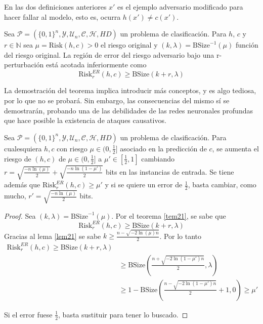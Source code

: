 En las dos definiciones anteriores $x'$ es el ejemplo adversario modificado para hacer fallar al modelo, esto es, ocurra $h(x')\neq c(x')$.

\begin{teorema} \label{tem21}
Sea \(\mathcal{P}=(\{0,1\}^n,\mathcal{Y},\mathcal{U}_n,\mathcal{C},\mathcal{H},HD)\) un problema de clasificación. Para \(h\), \(c\) y \(r \in \mathbb{N}\) sea \(\mu = \text{Risk}(h,c) > 0\) el riesgo original y \((k,\lambda)=\text{BSize}^{-1}(\mu)\) función del riesgo original. La región de error del riesgo adversario bajo una r-perturbación está acotada inferiormente como
\[
\text{Risk}_r^{ER}(h,c) \geq \text{BSize}(k+r,\lambda)
\]
\end{teorema}


La demostración del teorema implica introducir más conceptos, y es algo tediosa, por lo que no se probará. Sin embargo, las consecuencias del mismo sí se demostrarán, probando una de las debilidades de las redes neuronales profundas  que hace posible la existencia de ataques causativos.

\begin{corolario}
Sea \(\mathcal{P}=(\{0,1\}^n,\mathcal{Y},\mathcal{U}_n,\mathcal{C},\mathcal{H},HD)\) un problema de clasificación. Para cualesquiera \(h,c\) con riesgo \(\mu \in (0,\frac{1}{2}]\) asociado en la predicción de \(c\), se aumenta el riesgo de \((h,c)\) de \(\mu \in (0,\frac{1}{2}]\) a \(\mu' \in [\frac{1}{2},1]\) cambiando \(r=\sqrt{\frac{-n \ln(\mu)}{2}}+\sqrt{\frac{-n \ln(1-\mu')}{2}}\) bits en las instancias de entrada. Se tiene además que \(\text{Risk}_r^{ER}(h,c)\geq \mu'\) y si se quiere un error de \(\frac{1}{2}\), basta cambiar, como mucho, \(r'=\sqrt{\frac{-n \ln(\mu)}{2}}\) bits.
\end{corolario}
\begin{proof}
Sea \((k,\lambda)=\text{BSize}^{-1}(\mu)\). Por el teorema \ref{tem21}, se sabe que 
\[
\text{Risk}_r^{ER}(h,c) \geq \text{BSize}(k+r,\lambda)
\]
Gracias al lema \ref{lem21} se sabe \(k \geq \frac{n-\sqrt{-2 \ln(\mu)n}}{2}\). Por lo tanto
\begin{align}
\text{Risk}_r^{ER}(h,c) \geq \text{BSize}(k+r,\lambda) \\
&\geq \text{BSize}\left(\frac{n+\sqrt{-2 \ln(1-\mu')n}}{2},\lambda\right) \\
&\geq 1-\text{BSize}\left(\frac{n-\sqrt{-2 \ln(1-\mu')n}}{2}+1,0\right) \geq \mu'
\end{align}

Si el error fuese \(\frac{1}{2}\), basta sustituir para tener lo buscado.
\end{proof}

